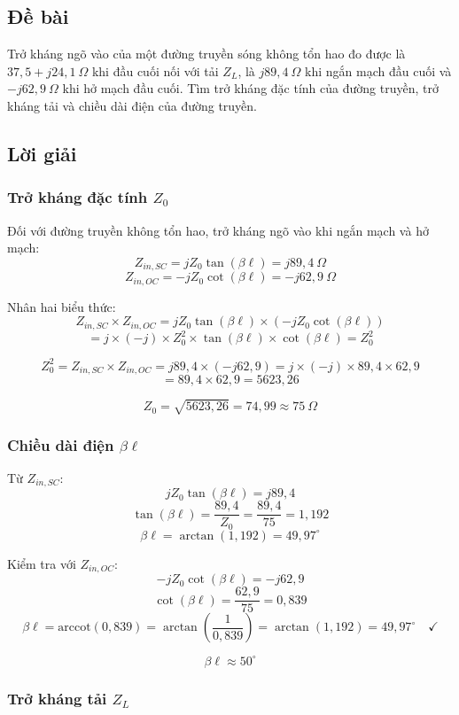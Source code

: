 \documentclass[12pt,a4paper]{article}
\begin{document}
\subsection{Đề bài}
Trở kháng ngõ vào của một đường truyền sóng không tổn hao đo được là $37{,}5 + j24{,}1~\Omega$ khi đầu cuối nối với tải $Z_L$, là $j89{,}4~\Omega$ khi ngắn mạch đầu cuối và $-j62{,}9~\Omega$ khi hở mạch đầu cuối. Tìm trở kháng đặc tính của đường truyền, trở kháng tải và chiều dài điện của đường truyền.

\subsection{Lời giải}

\subsubsection{Trở kháng đặc tính $Z_0$}

Đối với đường truyền không tổn hao, trở kháng ngõ vào khi ngắn mạch và hở mạch:
\[
Z_{in,SC} = jZ_0 \tan(\beta\ell) = j89{,}4~\Omega
\]
\[
Z_{in,OC} = -jZ_0 \cot(\beta\ell) = -j62{,}9~\Omega
\]

Nhân hai biểu thức:
\[
Z_{in,SC} \times Z_{in,OC} = jZ_0\tan(\beta\ell) \times (-jZ_0\cot(\beta\ell))
\]
\[
= j \times (-j) \times Z_0^2 \times \tan(\beta\ell) \times \cot(\beta\ell) = Z_0^2
\]

\[
Z_0^2 = Z_{in,SC} \times Z_{in,OC} = j89{,}4 \times (-j62{,}9) = j \times (-j) \times 89{,}4 \times 62{,}9
\]
\[
= 89{,}4 \times 62{,}9 = 5623{,}26
\]

\[
\boxed{Z_0 = \sqrt{5623{,}26} = 74{,}99 \approx 75~\Omega}
\]

\subsubsection{Chiều dài điện $\beta\ell$}

Từ $Z_{in,SC}$:
\[
jZ_0\tan(\beta\ell) = j89{,}4
\]
\[
\tan(\beta\ell) = \frac{89{,}4}{Z_0} = \frac{89{,}4}{75} = 1{,}192
\]
\[
\beta\ell = \arctan(1{,}192) = 49{,}97^\circ
\]

Kiểm tra với $Z_{in,OC}$:
\[
-jZ_0\cot(\beta\ell) = -j62{,}9
\]
\[
\cot(\beta\ell) = \frac{62{,}9}{75} = 0{,}839
\]
\[
\beta\ell = \text{arccot}(0{,}839) = \arctan\left(\frac{1}{0{,}839}\right) = \arctan(1{,}192) = 49{,}97^\circ \quad \checkmark
\]

\[
\boxed{\beta\ell \approx 50^\circ}
\]

\subsubsection{Trở kháng tải $Z_L$}
\end{document}
